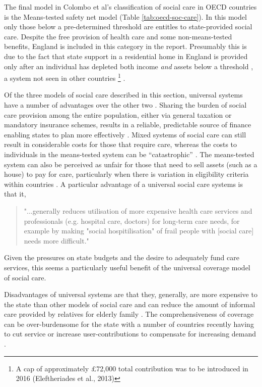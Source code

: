 \documentclass[12pt,]{report}
\let\rmarkdownfootnote\footnote%
\def\footnote{\protect\rmarkdownfootnote}
\begin{document}
The final model in Colombo et al's \citeyearpar{RN414} classification of
social care in OECD countries is the Means-tested safety net model
(Table \ref{tab:oecd-soc-care}). In this model only those below a
pre-determined threshold are entitles to state-provided social care.
Despite the free provision of health care and some non-means-tested
benefits, England is included in this category in the report. Presumably
this is due to the fact that state support in a residential home in
England is provided only after an individual has depleted both income
\emph{and} assets below a threshold \citep{RN414}, a system not seen in
other countries
\footnote{A cap of approximately £72,000 total contribution was to be introduced in 2016 (Eleftheriades et al., 2013)}
\citep{RN420}.

Of the three models of social care described in this section, universal
systems have a number of advantages over the other two
\citep{RN414, RN420}. Sharing the burden of social care provision among
the entire population, either via general taxation or mandatory
insurance schemes, results in a reliable, predictable source of finance
enabling states to plan more effectively \citep{RN414, RN420, RN413}.
Mixed systems of social care can still result in considerable costs for
those that require care, whereas the costs to individuals in the
means-tested system can be ``catastrophic'' \citep[pp240]{RN414}. The
means-tested system can also be perceived as unfair for those that need
to sell assets (such as a house) to pay for care, particularly when
there is variation in eligibility criteria within countries
\citep{RN414, RN420, RN421, RN407, RN413}. A particular advantage of a
universal social care systems is that it,

\begin{quotation} 
"...generally reduces utilisation of more expensive health care services and professionals (e.g. hospital care, doctors) for long-term care needs, for example by making "social hospitilisation" of frail people with [social care] needs more difficult." 
\end{quotation}

\citep[pp.222]{RN414}

Given the pressures on state budgets and the desire to adequately fund
care services, this seems a particularly useful benefit of the universal
coverage model of social care.

Disadvantages of universal systems are that they, generally, are more
expensive to the state than other models of social care and can reduce
the amount of informal care provided by relatives for elderly family
\citep{RN414, RN407}. The comprehensiveness of coverage can be
over-burdensome for the state with a number of countries recently having
to cut service or increase user-contributions to compensate for
increasing demand \citep{RN345, RN421, RN407, RN413}.
\end{document}
